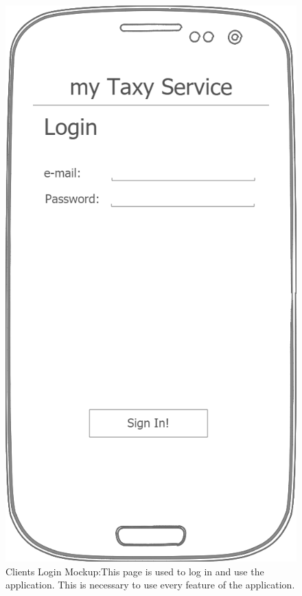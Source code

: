 \documentclass[a4paper]{article}
\begin{document}
\begin{figure}[H]
\includegraphics[width=\mockupWidth]{Mockup-ClientsLogin}
\centering
\caption[Clients Login Mockup]{Clients Login Mockup:\newline This page is used to log in and use the application. This is necessary to use every feature of the application.}
\label{fig:mockupclientlogin}
\end{figure}
\end{document}
